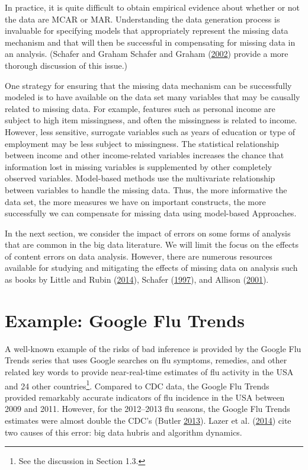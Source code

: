 \documentclass[]{krantz}
\begin{document}
In practice, it is quite difficult to obtain empirical evidence about
whether or not the data are MCAR or MAR. Understanding the data
generation process is invaluable for specifying models that
appropriately represent the missing data mechanism and that will then be
successful in compensating for missing data in an analysis. (Schafer and
Graham Schafer and Graham
(\protect\hyperlink{ref-schafer2002missing}{2002}) provide a more
thorough discussion of this issue.)

One strategy for ensuring that the missing data mechanism can be
successfully modeled is to have available on the data set many variables
that may be causally related to missing data. For example, features such
as personal income are subject to high item missingness, and often the
missingness is related to income. However, less sensitive, surrogate
variables such as years of education or type of employment may be less
subject to missingness. The statistical relationship between income and
other income-related variables increases the chance that information
lost in missing variables is supplemented by other completely observed
variables. Model-based methods use the multivariate relationship between
variables to handle the missing data. Thus, the more informative the
data set, the more measures we have on important constructs, the more
successfully we can compensate for missing data using model-based
Approaches.

In the next section, we consider the impact of errors on some forms of
analysis that are common in the big data literature. We will limit the
focus on the effects of content errors on data analysis. However, there
are numerous resources available for studying and mitigating the effects
of missing data on analysis such as books by Little and Rubin
(\protect\hyperlink{ref-little2014statistical}{2014}), Schafer
(\protect\hyperlink{ref-schafer1997analysis}{1997}), and Allison
(\protect\hyperlink{ref-allison2001missing}{2001}).

\section{Example: Google Flu Trends}\label{sec:10-3}

A well-known example of the risks of bad inference is provided by the
Google Flu Trends series that uses Google searches on flu symptoms,
remedies, and other related key words to provide near-real-time
estimates of flu activity in the USA and 24 other countries\footnote{See
  the discussion in Section 1.3.}. Compared to CDC data, the Google Flu
Trends provided remarkably accurate indicators of flu incidence in the
USA between 2009 and 2011. However, for the 2012--2013 flu seasons, the
Google Flu Trends estimates were almost double the CDC's (Butler
\protect\hyperlink{ref-butler2013google}{2013}). Lazer et al.
(\protect\hyperlink{ref-lazer2014parable}{2014}) cite two causes of this
error: big data hubris and algorithm dynamics.
\end{document}
